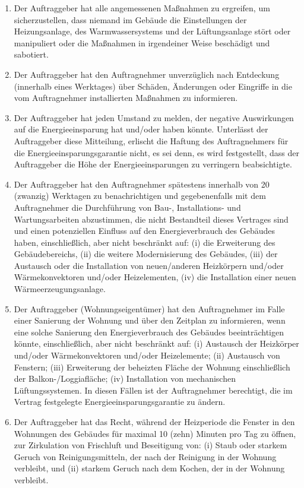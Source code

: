 \begin{multicols}{2}
\begin{enumerate}
   \item Der Auftraggeber hat alle angemessenen Maßnahmen zu ergreifen, um sicherzustellen, dass niemand im Gebäude die Einstellungen der Heizungsanlage, des Warmwassersystems und der Lüftungsanlage stört oder manipuliert oder die Maßnahmen in irgendeiner Weise beschädigt und sabotiert.
   \item Der Auftraggeber hat den Auftragnehmer unverzüglich nach Entdeckung (innerhalb eines Werktages) über Schäden, Änderungen oder Eingriffe in die vom Auftragnehmer installierten Maßnahmen zu informieren.
   \item Der Auftraggeber hat jeden Umstand zu melden, der negative Auswirkungen auf die Energieeinsparung hat und/oder haben könnte. Unterlässt der Auftraggeber diese Mitteilung, erlischt die Haftung des Auftragnehmers für die Energieeinsparungsgarantie nicht, es sei denn, es wird festgestellt, dass der Auftraggeber die Höhe der Energieeinsparungen zu verringern beabsichtigte.
   \item Der Auftraggeber hat den Auftragnehmer spätestens innerhalb von 20 (zwanzig) Werktagen zu benachrichtigen und gegebenenfalls mit dem Auftragnehmer die Durchführung von Bau-, Installations- und Wartungsarbeiten abzustimmen, die nicht Bestandteil dieses Vertrages sind und einen potenziellen Einfluss auf den Energieverbrauch des Gebäudes haben, einschließlich, aber nicht beschränkt auf: (i) die Erweiterung des Gebäudebereichs, (ii) die weitere Modernisierung des Gebäudes, (iii) der Austausch oder die Installation von neuen/anderen Heizkörpern und/oder Wärmekonvektoren und/oder Heizelementen, (iv) die Installation einer neuen Wärmeerzeugungsanlage.
   \item Der Auftraggeber (Wohnungseigentümer) hat den Auftragnehmer im Falle einer Sanierung der Wohnung und über den Zeitplan zu informieren, wenn eine solche Sanierung den Energieverbrauch des Gebäudes beeinträchtigen könnte, einschließlich, aber nicht beschränkt auf: (i) Austausch der Heizkörper und/oder Wärmekonvektoren und/oder Heizelemente; (ii) Austausch von Fenstern; (iii) Erweiterung der beheizten Fläche der Wohnung einschließlich der Balkon-/Loggiafläche; (iv) Installation von mechanischen Lüftungssystemen. In diesen Fällen ist der Auftragnehmer berechtigt, die im Vertrag festgelegte Energieeinsparungsgarantie zu ändern.
   \item Der Auftraggeber hat das Recht, während der Heizperiode die Fenster in den Wohnungen des Gebäudes für maximal 10 (zehn) Minuten pro Tag zu öffnen, zur Zirkulation von Frischluft und Beseitigung von: (i) Staub oder starkem Geruch von Reinigungsmitteln, der nach der Reinigung in der Wohnung verbleibt, und (ii) starkem Geruch nach dem Kochen, der in der Wohnung verbleibt.

\end{enumerate}
\end{multicols}
